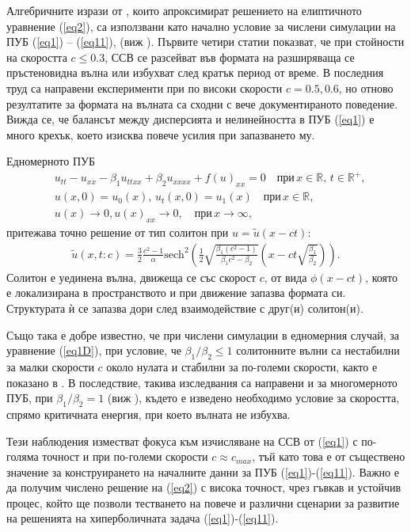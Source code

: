 \documentclass[a5paper]{article}
\newcommand{\rf}[1]{(\ref{#1})}
\newcommand{\RR}{\mathbb{R}}
\theoremstyle{remark}
\begin{document}
\begin{large}
Алгебричните изрази от \cite{ref15}, които апроксимират решението на елиптичното уравнение \rf{eq2}, са използвани като начално условие за числени симулации на ПУБ \rf{eq1} -- \rf{eq11}, 
(виж  \cite{ref21, ref20, ref23, ref22, ref24}). Първите четири статии показват, че при стойности на скоростта $c \le 0.3$, ССВ се разсейват във формата на разширяваща се пръстеновидна вълна или избухват след кратък период от време. В последния труд \cite{ref24} са направени експерименти при по високи скорости $c=0.5,0.6$, 
но отново резултатите за формата на вълната са сходни с вече документираното поведение. 
Вижда се, че балансът между дисперсията и нелинейността в ПУБ \rf{eq1} е много крехък, 
което изисква повече усилия при запазването му. 

Едномерното ПУБ
\begin{align}
&u_{tt} - u_{xx} -\beta_1  u_{ttxx} +\beta_2 u_{xxxx} + f(u)_{xx}=0   \quad \text{при} \,  x \in \RR, \, t\in\RR^+,\label{eq1D}
\\ \nonumber &u(x,0)=u_0(x), \, u_t(x,0)=u_1(x)   \quad\text{при} \, x \in \RR,
\\  &u(x) \rightarrow 0,  u(x)_{xx} \rightarrow 0 ,  \quad \text{при} \, x \rightarrow \infty, \label{eq1d1}
\end{align}
притежава точно решение от тип солитон при $u =\tilde u(x-ct)$:
\begin{align}
\tilde u(x,t:c) = \frac{3}{2} \frac{c^2-1}{\alpha}\text{sech}^2 \left( \frac{1}{2}  \sqrt{ \frac{\beta_1 (c^2-1)}{\beta_1 c^2-\beta_2}} (x-c t \sqrt{\frac{\beta_1}{\beta_2}} ) \right).
\end{align}
Солитон е уединена вълна, движеща се със скорост $c$, от вида $\phi(x-ct)$, която е локализирана в пространството и при движение запазва формата си. Структурата ѝ се запазва дори след взаимодействие с друг(и) солитон(и).

Също така е добре известно, 
че при числени симулации в едномерния случай, за уравнение \rf{eq1D}, при условие, че $\beta_1/\beta_2 \le 1$ солитонните вълни са нестабилни за малки скорости $c$ около нулата и стабилни за 
по-големи скорости, както е показано в \cite{ref10000}. В последствие, такива изследвания са направени и за многомерното ПУБ, при $\beta_1/\beta_2 = 1$ (виж \cite{ref1c0}), където е изведено необходимо условие за скоростта, спрямо критичната енергия, при което вълната не избухва.

Тези наблюдения изместват фокуса към изчисляване на ССВ от \rf{eq1} с по-голяма точност и при по-големи скорости $c \approx c_{max}$, тъй като това е от съществено значение за конструирането на началните данни за ПУБ \rf{eq1}-\rf{eq11}. Важно е да получим числено решение на \rf{eq2} с висока точност, чрез гъвкав и устойчив процес, който ще позволи тестването на повече и различни сценарии за развитие на решенията на хиперболичната задача \rf{eq1}-\rf{eq11}.


\end{large}
\end{document}
